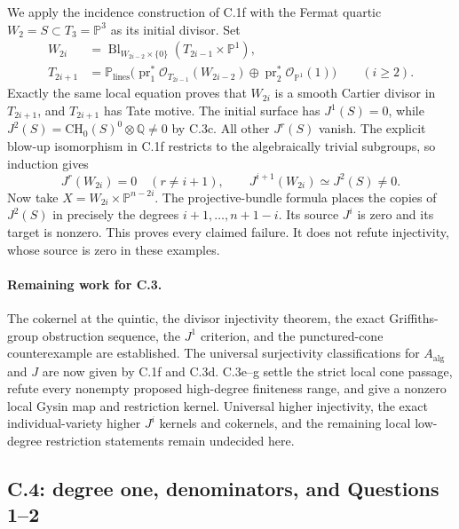 We apply the incidence construction of C.1f with the Fermat quartic
$W_2=S\subset T_3=\mathbb P^3$ as its initial divisor. Set
\[
\begin{split}
 W_{2i}&=\operatorname{Bl}_{W_{2i-2}\times\{0\}}
                   (T_{2i-1}\times\mathbb P^1),\\
 T_{2i+1}&=\mathbb P_{\mathrm{lines}}
 \bigl(\operatorname{pr}_1^*\mathcal O_{T_{2i-1}}(W_{2i-2})
       \oplus\operatorname{pr}_2^*\mathcal O_{\mathbb P^1}(1)\bigr)
       \qquad(i\ge2).
\end{split}
\]
Exactly the same local equation proves that $W_{2i}$ is a smooth
Cartier divisor in $T_{2i+1}$, and $T_{2i+1}$ has Tate motive.
The initial surface has $J^1(S)=0$, while
$J^2(S)=\mathrm{CH}_0(S)^0\otimes\mathbb Q\ne0$ by C.3c.
All other $J^r(S)$ vanish. The explicit blow-up isomorphism in C.1f
restricts to the algebraically trivial subgroups, so induction gives
\[
 J^r(W_{2i})=0\quad(r\ne i+1),\qquad
 J^{i+1}(W_{2i})\simeq J^2(S)\ne0.
\]
Now take $X=W_{2i}\times\mathbb P^{n-2i}$. The projective-bundle
formula places the copies of $J^2(S)$ in precisely the degrees
$i+1,\ldots,n+1-i$. Its source $J^i$ is zero and its target is
nonzero. This proves every claimed failure. It does not refute
injectivity, whose source is zero in these examples.




\paragraph{Remaining work for C.3.}
The cokernel at the quintic, the divisor injectivity theorem, the exact
Griffiths-group obstruction sequence, the $J^1$ criterion, and the
punctured-cone counterexample are established. The universal
surjectivity classifications for $A_{\mathrm{alg}}$ and $J$ are now
given by C.1f and C.3d. C.3e--g settle the strict local cone
passage, refute every nonempty proposed high-degree finiteness
range, and give a nonzero local Gysin map and restriction kernel.
Universal higher injectivity, the exact individual-variety higher
$J^i$ kernels and cokernels, and the remaining local low-degree
restriction statements remain undecided here.

\subsection{C.4: degree one, denominators, and Questions 1--2}

